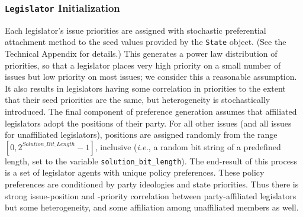 \documentclass[pdftex,12pt]{llncs}
\begin{document}
\subsubsection{\texttt{Legislator} Initialization}
Each legislator's issue priorities are assigned with stochastic preferential attachment method to the seed values provided by the \texttt{State} object. (See the Technical Appendix for details.)
This generates a power law distribution of priorities, so that a legislator places very high priority on a small number of issues but low priority on most issues; we consider this a reasonable assumption. It also results in legislators having some correlation in priorities to the extent that their seed priorities are the same, but heterogeneity is stochastically introduced.
The final component of preference generation assumes that affiliated legislators adopt the positions of their party. For all other issues (and all issues for unaffiliated legislators), positions are assigned randomly from the range $[0, 2^{Solution\_Bit\_Length} - 1]$, inclusive (\textit{i.e.}, a random bit string of a predefined length, set to the variable \texttt{solution\_bit\_length}).
The end-result of this process is a set of legislator agents with unique policy preferences. These policy preferences are conditioned by party ideologies and state priorities. Thus there is strong issue-position and -priority correlation between party-affiliated legislators but some heterogeneity, and some affiliation among unaffiliated members as well.
\end{document}
